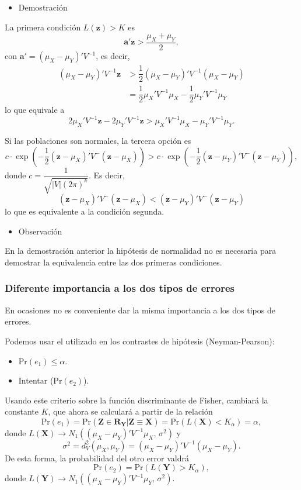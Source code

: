 \begin{itemize}[label=\color{red}\textbullet, leftmargin=*]
	\item \color{lightblue}Demostración
\end{itemize}
La primera condición $L(\mathbf{z})>K$ es \[ \mathbf{a'z}>\dfrac{\mu_X+\mu_Y}{2}, \] con $\mathbf{a'}=(\mu_X-\mu_Y)'V^{-1}$, es decir, \[ \begin{aligned}
(\mu_X-\mu_Y)'V^{-1}\mathbf{z}&>\dfrac{1}{2}(\mu_X-\mu_Y)'V^{-1}(\mu_X-\mu_Y)\\
&=\dfrac{1}{2}\mu_X'V^{-1}\mu_X-\dfrac{1}{2}\mu_Y'V^{-1}\mu_Y
\end{aligned} \]lo que equivale a \[ 2\mu_X'V^{-1}\mathbf{z}-2\mu_Y'V^{-1}\mathbf{z}>\mu_X'V^{-1}\mu_X-\mu_Y'V^{-1}\mu_Y. \]

Si las poblaciones son normales, la tercera opción es \[ c\cdot\exp\left(-\dfrac{1}{2}(\mathbf{z}-\mu_X)'V^{-}(\mathbf{z}-\mu_X)\right)>c\cdot\exp\left(-\dfrac{1}{2}(\mathbf{z}-\mu_Y)'V^{-}(\mathbf{z}-\mu_Y)\right), \]donde $c=\dfrac{1}{\sqrt{|V|(2\pi )^k}}$. Es decir, \[ (\mathbf{z}-\mu_X)'V^{-}(\mathbf{z}-\mu_X)<(\mathbf{z}-\mu_Y)'V^{-}(\mathbf{z}-\mu_Y) \]lo que es equivalente a la condición segunda.
\begin{itemize}[label=\color{red}\textbullet, leftmargin=*]
	\item \color{lightblue}Observación
\end{itemize}
En la demostración anterior la hipótesis de normalidad no es necesaria para demostrar la equivalencia entre las dos primeras condiciones.
\subsubsection{Diferente importancia a los dos tipos de errores}
En ocasiones no es conveniente dar la misma importancia a los dos tipos de errores.

Podemos usar el  utilizado en los contrastes de hipótesis (Neyman-Pearson):
\begin{itemize}
\item {} $\mathrm{Pr}(e_1)\le\alpha$.
\item Intentar  ($\mathrm{Pr}(e_2)$).
\end{itemize}
Usando este criterio sobre la función discriminante de Fisher, cambiará la constante $K$, que ahora se calculará a partir de la relación \[ \mathrm{Pr}(e_1)=\mathrm{Pr}(\mathbf{Z\in R_Y|Z\equiv X})=\mathrm{Pr}(L(\mathbf{X})<K_\alpha)=\alpha, \]donde $L(\mathbf{X})\longrightarrow N_1\left((\mu_X-\mu_Y)'V^{-1}\mu_X,\,\sigma^2\right)$ y \[ \sigma^2=d_V^2(\mu_X,\mu_Y)=(\mu_X-\mu_Y)'V^{-1}(\mu_X-\mu_Y). \]
De esta forma, la probabilidad del otro error valdrá \[ \mathrm{Pr}(e_2)=\mathrm{Pr}(L(\mathbf{Y})>K_\alpha), \]donde $L(\mathbf{Y})\longrightarrow N_1\left((\mu_X-\mu_Y)'V^{-1}\mu_Y,\,\sigma^2\right)$.
